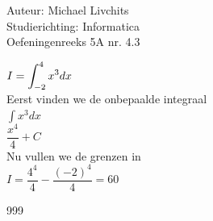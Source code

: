 \documentclass[a4paper]{article}
\newcommand{\dint}{\displaystyle\int}
\begin{document}
  
\noindent \large Auteur: Michael Livchits \\
\noindent \large Studierichting: Informatica\\
\noindent \large Oefeningenreeks 5A nr. 4.3\\

\medskip

\normalsize

$I = \displaystyle\dint_{-2}^4 x^3dx$\\

Eerst vinden we de onbepaalde integraal\\

$\displaystyle\int x^3dx$\\

$\dfrac{x^4}{4} + C$\\

Nu vullen we de grenzen in\\

$I = \dfrac{4^4}{4}-\dfrac{(-2)^4}{4} = 60$\\

\begin{thebibliography}{999}
\end{thebibliography}
\end{document}
